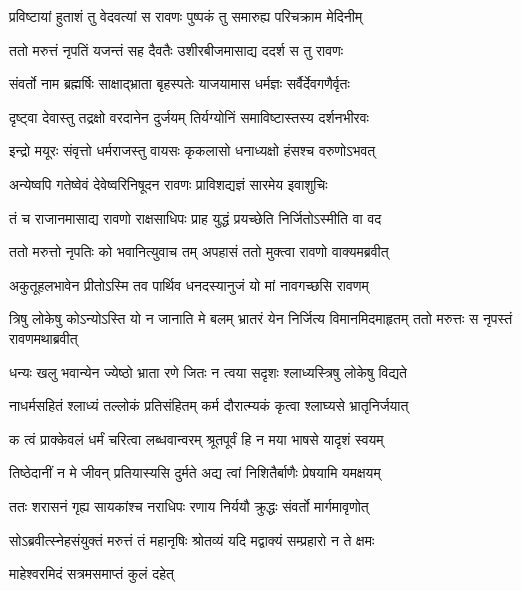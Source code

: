 
\twolineshloka
{प्रविष्टायां हुताशं तु वेदवत्यां स रावणः}
{पुष्पकं तु समारुह्य परिचक्राम मेदिनीम्} %

\twolineshloka
{ततो मरुत्तं नृपतिं यजन्तं सह दैवतैः}
{उशीरबीजमासाद्य ददर्श स तु रावणः} %

\twolineshloka
{संवर्तो नाम ब्रह्मर्षिः साक्षाद्भ्राता बृहस्पतेः}
{याजयामास धर्मज्ञः सर्वैर्देवगणैर्वृतः} %

\twolineshloka
{दृष्ट्वा देवास्तु तद्रक्षो वरदानेन दुर्जयम्}
{तिर्यग्योनिं समाविष्टास्तस्य दर्शनभीरवः} %

\twolineshloka
{इन्द्रो मयूरः संवृत्तो धर्मराजस्तु वायसः}
{कृकलासो धनाध्यक्षो हंसश्च वरुणोऽभवत्} %

\twolineshloka
{अन्येष्वपि गतेष्वेवं देवेष्वरिनिषूदन}
{रावणः प्राविशद्यज्ञं सारमेय इवाशुचिः} %

\twolineshloka
{तं च राजानमासाद्य रावणो राक्षसाधिपः}
{प्राह युद्धं प्रयच्छेति निर्जितोऽस्मीति वा वद} %

\twolineshloka
{ततो मरुत्तो नृपतिः को भवानित्युवाच तम्}
{अपहासं ततो मुक्त्वा रावणो वाक्यमब्रवीत्} %

\twolineshloka
{अकुतूहलभावेन प्रीतोऽस्मि तव पार्थिव}
{धनदस्यानुजं यो मां नावगच्छसि रावणम्} %

\threelineshloka
{त्रिषु लोकेषु कोऽन्योऽस्ति यो न जानाति मे बलम्}
{भ्रातरं येन निर्जित्य विमानमिदमाहृतम्}
{ततो मरुत्तः स नृपस्तं रावणमथाब्रवीत्} %

\twolineshloka
{धन्यः खलु भवान्येन ज्येष्ठो भ्राता रणे जितः}
{न त्वया सदृशः श्लाध्यस्त्रिषु लोकेषु विद्यते} %

\twolineshloka
{नाधर्मसहितं श्लाध्यं तल्लोकं प्रतिसंहितम्}
{कर्म दौरात्म्यकं कृत्वा श्लाघ्यसे भ्रातृनिर्जयात्} %

\twolineshloka
{क त्वं प्राक्केवलं धर्मं चरित्वा लब्धवान्वरम्}
{श्रूतपूर्वं हि न मया भाषसे यादृशं स्वयम्} %

\twolineshloka
{तिष्ठेदानीं न मे जीवन् प्रतियास्यसि दुर्मते}
{अद्य त्वां निशितैर्बाणैः प्रेषयामि यमक्षयम्} %

\twolineshloka
{ततः शरासनं गृह्य सायकांश्च नराधिपः}
{रणाय निर्ययौ क्रुद्धः संवर्तो मार्गमावृणोत्} %

\twolineshloka
{सोऽब्रवीत्स्नेहसंयुक्तं मरुत्तं तं महानृषिः}
{श्रोतव्यं यदि मद्वाक्यं सम्प्रहारो न ते क्षमः} %

\onelineshloka
{माहेश्वरमिदं सत्रमसमाप्तं कुलं दहेत्} %

